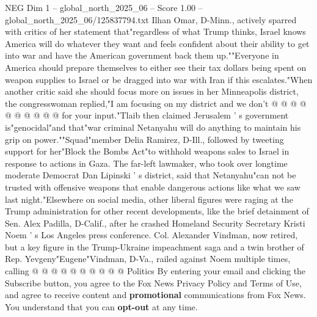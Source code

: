 \begin{textsample}{NEG Dim 1 – global\_north\_2025\_06 – Score 1.00 – global\_north\_2025\_06/125837794.txt}
Ilhan Omar, D-Minn., actively sparred with critics of her statement that"regardless of what Trump thinks, Israel knows America will do whatever they want and feels confident about their ability to get into war and have the American government back them up.""Everyone in America should prepare themselves to either see their tax dollars being spent on weapon supplies to Israel or be dragged into war with Iran if this escalates."When another critic said she should focus more on issues in her Minneapolis district, the congresswoman replied,"I am focusing on my district and we don't @ @ @ @ @ @ @ @ @ @ for your input."Tlaib then claimed Jerusalem ' s government is"genocidal"and that"war criminal Netanyahu will do anything to maintain his grip on power.""Squad"member Delia Ramirez, D-Ill., followed by tweeting support for her"Block the Bombs Act"to withhold weapons sales to Israel in response to actions in Gaza.
The far-left lawmaker, who took over longtime moderate Democrat Dan Lipinski ' s district, said that Netanyahu"can not be trusted with offensive weapons that enable dangerous actions like what we saw last night."Elsewhere on social media, other liberal figures were raging at the Trump administration for other recent developments, like the brief detainment of Sen.
Alex Padilla, D-Calif., after he crashed Homeland Security Secretary Kristi Noem ' s Los Angeles press conference.
Col.
Alexander Vindman, now retired, but a key figure in the Trump-Ukraine impeachment saga and a twin brother of Rep.
Yevgeny"Eugene"Vindman, D-Va., railed against Noem multiple times, calling @ @ @ @ @ @ @ @ @ @ Politics By entering your email and clicking the Subscribe button, you agree to the Fox News Privacy Policy and Terms of Use, and agree to receive content and \textbf{promotional} communications from Fox News.
You understand that you can \textbf{opt-out} at any time.

\end{textsample}
